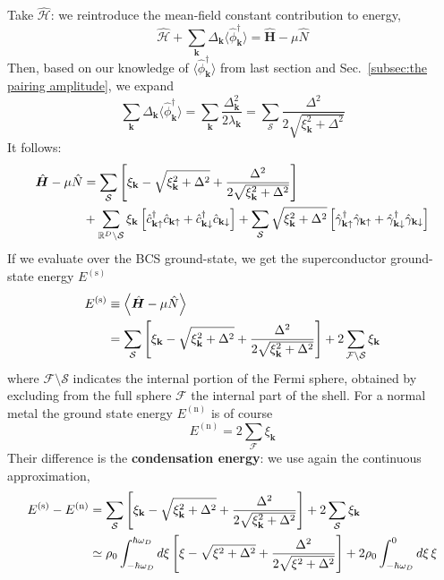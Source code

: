 Take $\hat{\mathcal{H}}$: we reintroduce the mean-field constant contribution to energy,
\[
	\hat{\mathcal{H}} + \sum_\mathbf{k} \Delta_\mathbf{k} \big\langle \hat{\phi}_\mathbf{k}^\dagger \big\rangle = \hat{\bm H} - \mu\hat{N}
\]
Then, based on our knowledge of $\big\langle \hat{\phi}_\mathbf{k}^\dagger \big\rangle$ from last section and Sec.~\ref{subsec:the pairing amplitude}, we expand
\[
	\sum_\mathbf{k} \Delta_\mathbf{k} \big\langle \hat{\phi}_\mathbf{k}^\dagger \big\rangle = \sum_\mathbf{k} \frac{\Delta_\mathbf{k}^2}{2\lambda_\mathbf{k}} = \sum_\mathcal{S} \frac{\Delta^2}{2\sqrt{\xi_\mathbf{k}^2 + \Delta^2}}
\]
It follows:
\[
\begin{aligned}
	\hat{\bm H} - \mu\hat{N} &= \sum_\mathcal{S} \left[{\xi_\mathbf{k} - \sqrt{\xi_\mathbf{k}^2 + \Delta^2} + \frac{\Delta^2}{2\sqrt{\xi_\mathbf{k}^2 + \Delta^2}}}\right] \\ 		
	&+ \sum_{\mathbb{R}^D\setminus\mathcal{S}} \xi_\mathbf{k} \left[{ \hat{c}_{\mathbf{k}\uparrow}^\dagger \hat{c}_{\mathbf{k}\uparrow}
	+ \hat{c}_{\mathbf{k}\downarrow}^\dagger \hat{c}_{\mathbf{k}\downarrow}}\right]
	+ \sum_\mathcal{S} \sqrt{\xi_\mathbf{k}^2 + \Delta^2} \left[{ \hat{\gamma}_{\mathbf{k}\uparrow}^\dagger \hat{\gamma}_{\mathbf{k}\uparrow} + \hat{\gamma}_{\mathbf{k}\downarrow}^\dagger \hat{\gamma}_{\mathbf{k}\downarrow}}\right]
\end{aligned}
\]
If we evaluate over the BCS ground-state, we get the superconductor ground-state energy $E^{(\mathrm{s})}$
\[
\begin{aligned}
	E^{(\mathrm{s})} &\equiv \ev{\hat{\bm H} - \mu\hat{N}} \\
	&= \sum_\mathcal{S} \lrS{\xi_\mathbf{k} - \sqrt{\xi_\mathbf{k}^2 + \Delta^2} + \frac{\Delta^2}{2\sqrt{\xi_\mathbf{k}^2 + \Delta^2}}}
	+ 2 \sum_{\mathcal{F}\setminus\mathcal{S}} \xi_\mathbf{k}
\end{aligned}
\]
where $\mathcal{F}\setminus\mathcal{S}$ indicates the internal portion of the Fermi sphere, obtained by excluding from the full sphere $\mathcal{F}$ the internal part of the shell.
For a normal metal the ground state energy $E^{(\mathrm{n})}$ is of course
\[
	E^{(\mathrm{n})} = 2 \sum_\mathcal{F} \xi_\mathbf{k}
\]
Their difference is the \textbf{condensation energy}: we use again the continuous approximation,
\[
\begin{aligned}
	E^{(\mathrm{s})} - E^{(\mathrm{n})} &= \sum_\mathcal{S} \left[{\xi_\mathbf{k} - \sqrt{\xi_\mathbf{k}^2 + \Delta^2} + \frac{\Delta^2}{2\sqrt{\xi_\mathbf{k}^2 + \Delta^2}}}\right]
	+ 2 \sum_\mathcal{S} \xi_\mathbf{k} \\
	&\simeq \rho_0 \int_{-\hbar\omega_D}^{\hbar\omega_D} d\xi \left[{\xi - \sqrt{\xi^2 + \Delta^2} + \frac{\Delta^2}{2\sqrt{\xi^2 + \Delta^2}}}\right] + 2 \rho_0 \int_{-\hbar\omega_D}^0 d\xi \, \xi
\end{aligned}
\]
